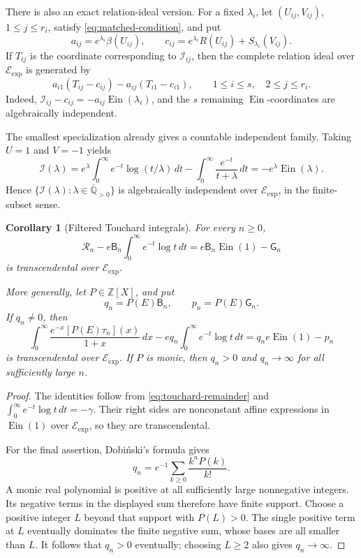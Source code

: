 \documentclass[11pt]{article}
\newtheorem{corollary}[theorem]{Corollary}
\theoremstyle{definition}
\theoremstyle{remark}
\newcommand{\Qbar}{\overline{\mathbb Q}}
\newcommand{\Z}{\mathbb Z}
\newcommand{\Ein}{\operatorname{Ein}}
\newcommand{\Eexp}{\mathcal E_{\mathrm{exp}}}
\begin{document}
There is also an exact relation-ideal version.  For a fixed \(\lambda_i\),
let \((U_{ij},V_{ij})\), \(1\leq j\leq r_i\), satisfy
\eqref{eq:matched-condition}, and put
\[
 a_{ij}=e^{\lambda_i}\beta(U_{ij}),
 \qquad
 c_{ij}=e^{\lambda_i}R(U_{ij})+S_{\lambda_i}(V_{ij}).
\]
If \(T_{ij}\) is the coordinate corresponding to
\(\mathscr I_{ij}\), then the complete relation ideal over \(\Eexp\) is
generated by
\begin{equation}\label{eq:matched-full-ideal}
 a_{i1}(T_{ij}-c_{ij})
 -a_{ij}(T_{i1}-c_{i1}),
 \qquad
 1\leq i\leq s,\quad 2\leq j\leq r_i.
\end{equation}
Indeed, \(\mathscr I_{ij}-c_{ij}=-a_{ij}\Ein(\lambda_i)\), and the
\(s\) remaining \(\Ein\)-coordinates are algebraically independent.

The smallest specialization already gives a countable independent family.
Taking \(U=1\) and \(V=-1\) yields
\begin{equation}\label{eq:minimal-matched-integral}
 \boxed{
 \mathscr I(\lambda)
 =e^\lambda\int_0^\infty e^{-t}\log(t/\lambda)\,dt
 -\int_0^\infty\frac{e^{-t}}{t+\lambda}\,dt
 =-e^\lambda\Ein(\lambda).}
\end{equation}
Hence
\(\{\mathscr I(\lambda):\lambda\in\Qbar_{>0}\}\) is algebraically
independent over \(\Eexp\), in the finite-subset sense.

\begin{corollary}[Filtered Touchard integrals]
\label{cor:filtered-touchard-transcendence}
For every \(n\geq0\),
\begin{equation}\label{eq:paired-touchard}
 \mathscr R_n-e\mathsf B_n
 \int_0^\infty e^{-t}\log t\,dt
 =e\mathsf B_n\Ein(1)-\mathsf G_n
\end{equation}
is transcendental over \(\Eexp\).

More generally, let \(P\in\Z[X]\), and put
\[
 q_n=P(E)\mathsf B_n,
 \qquad p_n=P(E)\mathsf G_n.
\]
If \(q_n\ne0\), then
\begin{equation}\label{eq:paired-filtered-touchard}
 \int_0^\infty
 \frac{e^{-x}[P(E)\tau_n](x)}{1+x}\,dx
 -eq_n\int_0^\infty e^{-t}\log t\,dt
 =q_ne\Ein(1)-p_n
\end{equation}
is transcendental over \(\Eexp\).
If \(P\) is monic, then \(q_n>0\) and \(q_n\to\infty\) for all
sufficiently large \(n\).
\end{corollary}

\begin{proof}
The identities follow from \eqref{eq:touchard-remainder} and
\(\int_0^\infty e^{-t}\log t\,dt=-\gamma\).  Their right sides are
nonconstant affine expressions in \(\Ein(1)\) over \(\Eexp\), so they are
transcendental.

For the final assertion, Dobi\'nski's formula gives
\[
 q_n=e^{-1}\sum_{k\geq0}\frac{k^nP(k)}{k!}.
\]
A monic real polynomial is positive at all sufficiently large nonnegative
integers.  Its negative terms in the displayed sum therefore have finite
support.  Choose a positive integer \(L\) beyond that support with
\(P(L)>0\).  The single positive term at \(L\) eventually dominates the
finite negative sum, whose bases are all smaller than \(L\).  It follows
that \(q_n>0\) eventually; choosing \(L\geq2\) also gives \(q_n\to\infty\).
\end{proof}
\end{document}
